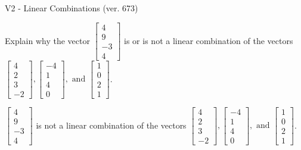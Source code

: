 \begin{exercise}
  \begin{exerciseTitle}V2 - Linear Combinations (ver. 673)\end{exerciseTitle}
  \begin{exerciseStatement}
    Explain why the vector \(\left[\begin{array}{c}
4 \\
9 \\
-3 \\
4
\end{array}\right]\)  is or is not a linear 
	combination of the vectors \(\left[\begin{array}{c}
4 \\
2 \\
3 \\
-2
\end{array}\right] , \left[\begin{array}{c}
-4 \\
1 \\
4 \\
0
\end{array}\right] , \text{ and } \left[\begin{array}{c}
1 \\
0 \\
2 \\
1
\end{array}\right]\).
	


  \end{exerciseStatement}
  \begin{exerciseAnswer}
   \(\left[\begin{array}{c}
4 \\
9 \\
-3 \\
4
\end{array}\right]\) 
  	 is not  
	a linear combination of the vectors \(\left[\begin{array}{c}
4 \\
2 \\
3 \\
-2
\end{array}\right] , \left[\begin{array}{c}
-4 \\
1 \\
4 \\
0
\end{array}\right] , \text{ and } \left[\begin{array}{c}
1 \\
0 \\
2 \\
1
\end{array}\right]\).

	
  


  \end{exerciseAnswer}
\end{exercise}